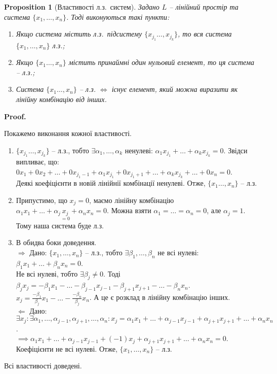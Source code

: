 \documentclass[a4paper, 10pt]{article}
\makeatletter
\def\rightproof{$\boxed{\Rightarrow}$ }
\def\leftproof{$\boxed{\Leftarrow}$ }
\theoremstyle{theoremdd}
\newtheorem{proposition}[theorem]{Proposition}
\renewenvironment{proof}[1][Proof.\\]{\par
\pushQED{\hfill \qed}%
\normalfont \topsep6\p@\@plus6\p@\relax
\trivlist
\item\relax
{\bfseries
#1\@addpunct{.}}\hspace\labelsep\ignorespaces
}{%
\popQED\endtrivlist\@endpefalse
}
\makeatother
\begin{document}
	\begin{proposition}[Властивості л.з.\ систем]
	Задано $L$ -- лінійний простір та система $\{x_1,\dots,x_n\}$. Тоді виконуються такі пункти:
	\begin{enumerate}[nosep, wide = 0pt, label={\arabic*)}]
	\item Якщо система містить л.з.\ підсистему $\{x_{j_1} \dots, x_{j_k}\}$, то вся система $\{x_1,\dots,x_n\}$ л.з.;
	\item Якщо $\{x_1 \dots, x_n\}$ містить принаймні один нульовий елемент, то ця система -- л.з.;
	\item Система $\{x_1 \dots, x_n\}$ -- л.з. $\iff$ існує елемент, який можна виразити як лінійну комбінацію від інших.
	\end{enumerate}
	\end{proposition}
	
	\begin{proof}
	Покажемо виконання кожної властивості.
	\begin{enumerate}[topsep=-\parskip, wide=0pt, label={\arabic*)}]
	\item $\{x_{j_1} \dots, x_{j_k}\}$ -- л.з., тобто $\exists \alpha_1, \dots, \alpha_k$ ненулеві: $\alpha_1 x_{j_1} + \dots + \alpha_k x_{j_k} = 0$. Звідси випливає, що:\\
	$0x_1 + 0x_2 + \dots + 0x_{j_1-1} + \alpha_1 x_{j_1} + 0x_{j_1 + 1} + \dots + \alpha_k x_{j_k} + \dots + 0 x_n = 0$.\\
	Деякі коефіцієнти в новій лінійнії комбінації ненулеві. Отже, $\{x_1 \dots, x_n\}$ -- л.з.
	\item Припустимо, що $x_j = 0$, маємо лінійну комбінацію $\alpha_1 x_1 + \dots + \alpha_j \underset{=0}{x_j} + \alpha_n x_n = 0$. Можна взяти $\alpha_1 = \dots = \alpha_n = 0$, але $\alpha_j = 1$. Тому наша система буде л.з.
	\item В обидва боки доведення.\\
	\rightproof Дано: $\{x_1, \dots, x_n\}$ -- л.з., тобто $\exists \beta_1, \dots, \beta_n$ не всі нулеві: $\beta_1 x_1 + \dots + \beta_n x_n = 0$.\\
	Не всі нулеві, тобто $\exists \beta_j \neq 0$. Тоді
	$\beta_j x_j = -\beta_1 x_1 - \dots - \beta_{j-1} x_{j-1} - \beta_{j+1} x_{j+1} - \dots - \beta_n x_n$.\\
	$\displaystyle x_j = \frac{-\beta_1}{\beta_j}x_1 - \dots - \frac{-\beta_n}{\beta_j}x_n$. А це є розклад в лінійну комбінацію інших.
	\bigskip \\
	\leftproof Дано: $\exists x_j: \exists \alpha_1, \dots, \alpha_{j-1}, \alpha_{j+1}, \dots, \alpha_n: x_j = \alpha_1 x_1 + \dots + \alpha_{j-1} x_{j-1} + \alpha_{j+1} x_{j+1} + \dots + \alpha_n x_n$.\\
	$\implies \alpha_1 x_1 + \dots + \alpha_{j-1} x_{j-1} + (-1)x_j + \alpha_{j+1} x_{j+1} + \dots + \alpha_n x_n = 0$.\\
	Коефіцієнти не всі нулеві. Отже, $\{x_1, \dots, x_n\}$ -- л.з.
	\end{enumerate}
	Всі властивості доведені.
	\end{proof}
	
\end{document}
